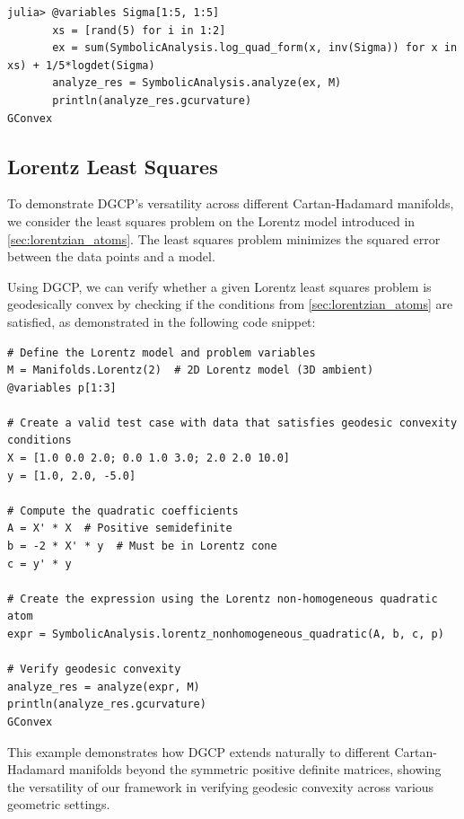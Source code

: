 \documentclass[twoside,11pt]{article}
\begin{document}
\begin{listing}[h!]
    \begin{verbatim}
julia> @variables Sigma[1:5, 1:5]
       xs = [rand(5) for i in 1:2]
       ex = sum(SymbolicAnalysis.log_quad_form(x, inv(Sigma)) for x in xs) + 1/5*logdet(Sigma)
       analyze_res = SymbolicAnalysis.analyze(ex, M)
       println(analyze_res.gcurvature)
GConvex
    \end{verbatim}
\end{listing}

\newpage

\subsection{Lorentz Least Squares}

To demonstrate DGCP's versatility across different Cartan-Hadamard manifolds, we consider the least squares problem on the Lorentz model introduced in \ref{sec:lorentzian_atoms}. The least squares problem minimizes the squared error between the data points and a model.

Using DGCP, we can verify whether a given Lorentz least squares problem is geodesically convex by checking if the conditions from \ref{sec:lorentzian_atoms} are satisfied, as demonstrated in the following code snippet:

\begin{listing}[h!]
\begin{verbatim}
# Define the Lorentz model and problem variables
M = Manifolds.Lorentz(2)  # 2D Lorentz model (3D ambient)
@variables p[1:3]

# Create a valid test case with data that satisfies geodesic convexity conditions
X = [1.0 0.0 2.0; 0.0 1.0 3.0; 2.0 2.0 10.0]
y = [1.0, 2.0, -5.0]

# Compute the quadratic coefficients
A = X' * X  # Positive semidefinite
b = -2 * X' * y  # Must be in Lorentz cone
c = y' * y

# Create the expression using the Lorentz non-homogeneous quadratic atom
expr = SymbolicAnalysis.lorentz_nonhomogeneous_quadratic(A, b, c, p)

# Verify geodesic convexity
analyze_res = analyze(expr, M)
println(analyze_res.gcurvature)
GConvex
\end{verbatim}
\end{listing}

This example demonstrates how DGCP extends naturally to different Cartan-Hadamard manifolds beyond the symmetric positive definite matrices, showing the versatility of our framework in verifying geodesic convexity across various geometric settings.
\end{document}
